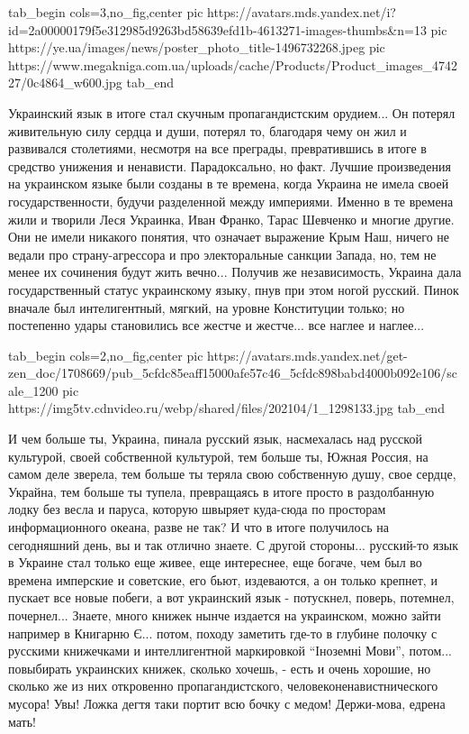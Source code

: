 \ifcmt
  tab_begin cols=3,no_fig,center
     pic https://avatars.mds.yandex.net/i?id=2a00000179f5e312985d9263bd58639efd1b-4613271-images-thumbs&n=13
		 pic https://ye.ua/images/news/poster_photo_title-1496732268.jpeg
		 pic https://www.megakniga.com.ua/uploads/cache/Products/Product_images_474227/0c4864_w600.jpg
  tab_end
\fi

Украинский язык в итоге стал скучным пропагандистским орудием... Он потерял
живительную силу сердца и души, потерял то, благодаря чему он жил и развивался
столетиями, несмотря на все преграды, превратившись в итоге в средство унижения
и ненависти. Парадоксально, но факт. Лучшие произведения на украинском языке
были созданы в те времена, когда Украина не имела своей государственности,
будучи разделенной между империями. Именно в те времена жили и творили Леся
Украинка, Иван Франко, Тарас Шевченко и многие другие. Они не имели никакого
понятия, что означает выражение Крым Наш, ничего не ведали про страну-агрессора
и про электоральные санкции Запада, но, тем не менее их сочинения будут жить
вечно... Получив же независимость, Украина дала государственный статус
украинскому языку, пнув при этом ногой русский. Пинок вначале был
интелигентный, мягкий, на уровне Конституции только; но постепенно удары
становились все жестче и жестче... все наглее и наглее... 

\ifcmt
  tab_begin cols=2,no_fig,center
     pic https://avatars.mds.yandex.net/get-zen_doc/1708669/pub_5cfdc85eaff15000afe57c46_5cfdc898babd4000b092e106/scale_1200
		 pic https://img5tv.cdnvideo.ru/webp/shared/files/202104/1_1298133.jpg
  tab_end
\fi

И чем больше ты, Украина, пинала русский язык, насмехалась над русской
культурой, своей собственной культурой, тем больше ты, Южная Россия, на самом
деле зверела, тем больше ты теряла свою собственную душу, свое сердце, Украйна,
тем больше ты тупела, превращаясь в итоге просто в раздолбанную лодку без весла
и паруса, которую швыряет куда-сюда по просторам информационного океана, разве
не так? И что в итоге получилось на сегодняшний день, вы и так отлично знаете.
С другой стороны... русский-то язык в Украине стал только еще живее, еще интереснее, еще
богаче, чем был во времена имперские и советские, его бьют, издеваются, а он
только крепнет, и пускает все новые побеги, а вот украинский язык - потускнел,
поверь, потемнел, почернел... Знаете, много книжек нынче издается на
украинском, можно зайти например в Книгарню Є... потом, походу заметить где-то в глубине
полочку с русскими книжечками и интеллигентной маркировкой \enquote{Іноземні
Мови}, потом...  повыбирать украинских книжек, сколько хочешь, - есть и очень
хорошие, но сколько же из них откровенно пропагандистского,
человеконенавистнического мусора! Увы! Ложка дегтя таки портит всю бочку с
медом! Держи-мова, едрена мать!


